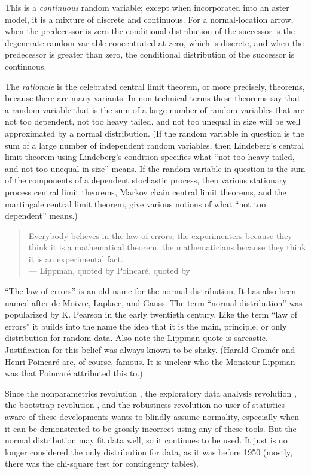 This is a \emph{continuous} random variable;
except when incorporated into an aster model, it is a mixture of discrete
and continuous.  For a normal-location arrow, when the predecessor is zero
the conditional distribution of the successor is the degenerate random variable
concentrated at zero, which is discrete, and when the predecessor is greater
than zero, the conditional distribution of the successor is continuous.

The \emph{rationale} is the celebrated central limit theorem,
or more precisely, theorems, because there are many variants.
In non-technical terms these theorems say that a random variable that is the sum
of a large number of random variables that are not too dependent,
not too heavy tailed, and not too unequal in size will be well approximated
by a normal distribution.  (If the random variable in question is the
sum of a large number of independent random variables, then Lindeberg's
central limit theorem using Lindeberg's condition specifies what
``not too heavy tailed, and not too unequal in size'' means.
If the random variable in question is the
sum of the components of a dependent stochastic process, then various
stationary process central limit theorems, Markov chain central limit theorems,
and the martingale central limit theorem, give various notions of what
``not too dependent'' means.)
\begin{quotation}
Everybody believes in the law of errors, the experimenters because they
think it is a mathematical theorem, the mathematicians because they
think it is an experimental fact.
\\
\hspace*{\fill} --- Lippman, quoted by Poincar\'{e}, quoted by \citet{cramer}
\end{quotation}
``The law of errors'' is an old name for the normal distribution.
It has also been named after de Moivre, Laplace, and Gauss.
The term ``normal distribution'' was popularized by K. Pearson in the early
twentieth century.  Like the term ``law of errors'' it builds into the name
the idea that it is the main, principle, or only distribution for random data.
Also note the Lippman quote is sarcastic.  Justification
for this belief was always known to be shaky.
(Harald Cram\'{e}r and Henri Poincar\'{e} are, of course, famous.  It is
unclear who the Monsieur Lippman was that Poincar\'{e} attributed this to.)

Since the nonparametrics revolution \citep{hollander-wolfe-chicken},
the exploratory data analysis revolution \citep{tukey},
the bootstrap revolution \citep{efron-tibshirani,davison-hinkley},
and the robustness revolution \citep{huber-ronchetti,hampel-et-al}
no user of statistics aware of these developments wants to blindly
assume normality, especially when it can be demonstrated to be grossly
incorrect using any of these tools.  But the normal distribution may
fit data well, so it continues to be used.  It just is no longer considered
the only distribution for data, as it was before 1950 (mostly, there was
the chi-square test for contingency tables).


